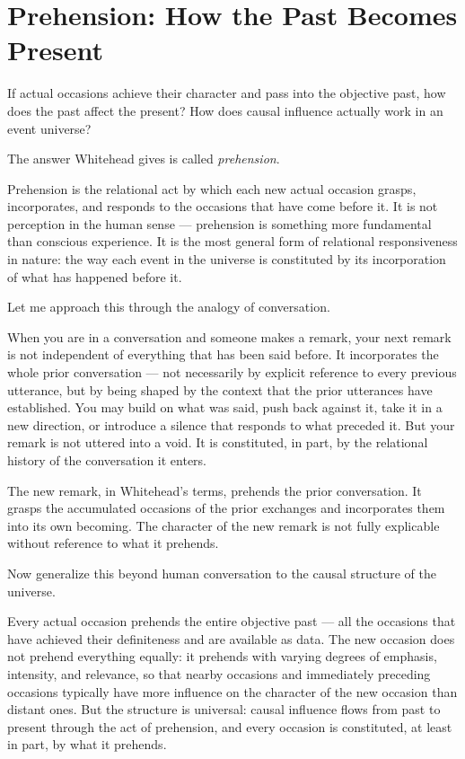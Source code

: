 \section{Prehension: How the Past Becomes Present}
\label{sec:ch4-prehension}

If actual occasions achieve their character and pass into the objective past,
how does the past affect the present?
How does causal influence actually work in an event universe?

The answer Whitehead gives is called \emph{prehension}.

Prehension is the relational act by which each new actual occasion grasps,
incorporates, and responds to the occasions that have come before it.
It is not perception in the human sense --- prehension is something more
fundamental than conscious experience.
It is the most general form of relational responsiveness in nature:
the way each event in the universe is constituted by its incorporation of
what has happened before it.

Let me approach this through the analogy of conversation.

When you are in a conversation and someone makes a remark, your next remark
is not independent of everything that has been said before.
It incorporates the whole prior conversation --- not necessarily by explicit
reference to every previous utterance, but by being shaped by the context
that the prior utterances have established.
You may build on what was said, push back against it, take it in a new
direction, or introduce a silence that responds to what preceded it.
But your remark is not uttered into a void.
It is constituted, in part, by the relational history of the conversation
it enters.

The new remark, in Whitehead's terms, prehends the prior conversation.
It grasps the accumulated occasions of the prior exchanges and incorporates
them into its own becoming.
The character of the new remark is not fully explicable without reference
to what it prehends.

Now generalize this beyond human conversation to the causal structure of
the universe.

Every actual occasion prehends the entire objective past --- all the occasions
that have achieved their definiteness and are available as data.
The new occasion does not prehend everything equally: it prehends with varying
degrees of emphasis, intensity, and relevance, so that nearby occasions and
immediately preceding occasions typically have more influence on the character
of the new occasion than distant ones.
But the structure is universal: causal influence flows from past to present
through the act of prehension, and every occasion is constituted, at least
in part, by what it prehends.

